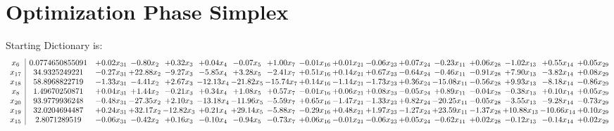 \documentclass[9pt]{article}
\begin{document}
\section{Optimization Phase Simplex}
Starting Dictionary is:
\[\begin{array}{c| c c@{\hskip 2pt} c@{\hskip 2pt} c@{\hskip 2pt} c@{\hskip 2pt} c@{\hskip 2pt} c@{\hskip 2pt} c@{\hskip 2pt} c@{\hskip 2pt} c@{\hskip 2pt} c@{\hskip 2pt} c@{\hskip 2pt} c@{\hskip 2pt} c@{\hskip 2pt} c@{\hskip 2pt} c@{\hskip 2pt} }
 x_{6}   &  0.0774650855091 & +  0.02 x_{31} & -0.80 x_{2} & +  0.32 x_{3} & +  0.04 x_{4} & -0.07 x_{5} & +  1.00 x_{7} & -0.01 x_{16} & +  0.01 x_{21} & -0.06 x_{23} & +  0.07 x_{24} & -0.23 x_{11} & +  0.06 x_{28} & -1.02 x_{13} & +  0.55 x_{14} & +  0.05 x_{29}\\
 x_{17}   &  34.9325249221 & -0.27 x_{31} & + 22.88 x_{2} & -9.27 x_{3} & -5.85 x_{4} & +  3.28 x_{5} & -2.41 x_{7} & +  0.51 x_{16} & +  0.14 x_{21} & +  0.67 x_{23} & -0.64 x_{24} & -0.46 x_{11} & -0.91 x_{28} & +  7.90 x_{13} & -3.82 x_{14} & +  0.08 x_{29}\\
 x_{18}   &  58.8968822719 & -1.33 x_{31} & -4.41 x_{2} & +  2.67 x_{3} & -12.13 x_{4} & -21.82 x_{5} & -15.74 x_{7} & +  0.14 x_{16} & -1.14 x_{21} & -1.73 x_{23} & +  0.36 x_{24} & -15.08 x_{11} & -0.56 x_{28} & +  9.93 x_{13} & -8.18 x_{14} & -0.86 x_{29}\\
 x_{8}   &  1.49670250871 & +  0.04 x_{31} & +  1.44 x_{2} & -0.21 x_{3} & +  0.34 x_{4} & +  1.08 x_{5} & +  0.57 x_{7} & -0.01 x_{16} & +  0.06 x_{21} & +  0.08 x_{23} & -0.05 x_{24} & +  0.89 x_{11} & -0.04 x_{28} & -0.38 x_{13} & +  0.10 x_{14} & +  0.05 x_{29}\\
 x_{20}   &  93.9779936248 & -0.48 x_{31} & -27.35 x_{2} & +  2.10 x_{3} & -13.18 x_{4} & -11.96 x_{5} & -5.59 x_{7} & +  0.65 x_{16} & -1.47 x_{21} & -1.33 x_{23} & +  0.82 x_{24} & -20.25 x_{11} & -0.05 x_{28} & -3.55 x_{13} & -9.28 x_{14} & -0.73 x_{29}\\
 x_{19}   &  32.0204694487 & +  0.24 x_{31} & + 32.17 x_{2} & -12.82 x_{3} & +  0.21 x_{4} & + 29.14 x_{5} & -5.88 x_{7} & -0.29 x_{16} & +  0.48 x_{21} & +  1.97 x_{23} & -1.27 x_{24} & + 23.59 x_{11} & -1.37 x_{28} & + 10.88 x_{13} & -10.66 x_{14} & +  0.10 x_{29}\\
 x_{15}   &  2.8071289519 & -0.06 x_{31} & -0.42 x_{2} & +  0.16 x_{3} & -0.10 x_{4} & -0.94 x_{5} & -0.73 x_{7} & +  0.06 x_{16} & -0.01 x_{21} & -0.06 x_{23} & +  0.05 x_{24} & -0.62 x_{11} & +  0.02 x_{28} & -0.12 x_{13} & -0.14 x_{14} & +  0.02 x_{29}\\

\end{array}\]
\end{document}

